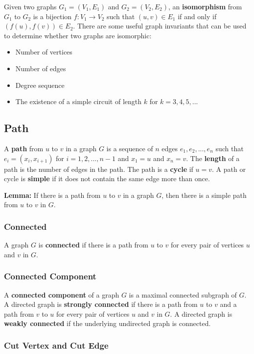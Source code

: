\documentclass[a4paper,12pt]{article}
\begin{document}
Given two graphs $G_1 = (V_1, E_1)$ and $G_2 = (V_2, E_2)$, an \textbf{isomorphism} from $G_1$ to $G_2$ is a bijection $f: V_1 \rightarrow V_2$ such that $(u,v) \in E_1$ if and only if $(f(u), f(v)) \in E_2$.
There are some useful graph invariants that can be used to determine whether two graphs are isomorphic:
\begin{itemize}
	\item Number of vertices
	\item Number of edges
	\item Degree sequence
	\item The existence of a simple circuit of length $k$ for $k = 3, 4, 5, ...$
\end{itemize}

\subsection{Path}

A \textbf{path} from $u$ to $v$ in a graph $G$ is a sequence of $n$ edges $e_1, e_2, ..., e_n$ such that $e_i = (x_i, x_{i+1})$ for $i = 1, 2, ..., n-1$ and $x_1 = u$ and $x_n = v$.
The \textbf{length} of a path is the number of edges in the path.
The path is a \textbf{cycle} if $u = v$.
A path or cycle is \textbf{simple} if it does not contain the same edge more than once.

\textbf{Lemma:}
If there is a path from $u$ to $v$ in a graph $G$, then there is a simple path from $u$ to $v$ in $G$.

\subsubsection{Connected}

A graph $G$ is \textbf{connected} if there is a path from $u$ to $v$ for every pair of vertices $u$ and $v$ in $G$.

\subsubsection{Connected Component}

A \textbf{connected component} of a graph $G$ is a maximal connected subgraph of $G$.
A directed graph is \textbf{strongly connected} if there is a path from $u$ to $v$ and a path from $v$ to $u$ for every pair of vertices $u$ and $v$ in $G$.
A directed graph is \textbf{weakly connected} if the underlying undirected graph is connected.

\subsubsection{Cut Vertex and Cut Edge}
\end{document}
